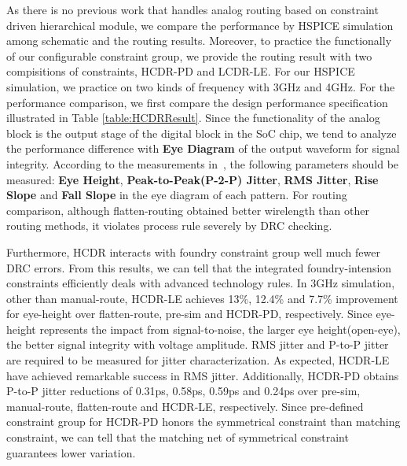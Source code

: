     As there is no previous work that handles analog routing based on constraint driven hierarchical module, we compare the performance by HSPICE simulation among schematic and the routing results. Moreover, to practice the functionally of our configurable constraint group, we provide the routing result with two compisitions of constraints, HCDR-PD and LCDR-LE. For our HSPICE simulation, we practice on two kinds of frequency with 3GHz and 4GHz. For the performance comparison, we first compare the design performance specification illustrated in Table \ref{table:HCDRResult}. Since the functionality of the analog block is the output stage of the digital block in the SoC chip, we tend to analyze the performance difference with {\bf Eye Diagram} of the output waveform for signal integrity. According to the measurements in~\cite{eyediagram}, the following parameters should be measured: {\bf Eye Height}, {\bf Peak-to-Peak(P-2-P) Jitter}, {\bf RMS Jitter}, {\bf Rise Slope} and {\bf Fall Slope} in the eye diagram of each pattern. For routing comparison, although flatten-routing obtained better wirelength than other routing methods, it violates process rule severely by DRC checking. 
    
    Furthermore, HCDR interacts with foundry constraint group well much fewer DRC errors. From this results, we can tell that the integrated foundry-intension constraints efficiently deals with advanced technology rules. In 3GHz simulation, other than manual-route, HCDR-LE achieves 13\%, 12.4\% and 7.7\% improvement for eye-height over flatten-route, pre-sim and HCDR-PD, respectively. Since eye-height represents the impact from signal-to-noise, the larger eye height(open-eye), the better signal integrity with voltage amplitude. RMS jitter and P-to-P jitter are required to be measured for jitter characterization. As expected, HCDR-LE have achieved remarkable success in RMS jitter. Additionally, HCDR-PD obtains P-to-P jitter reductions of 0.31ps, 0.58ps, 0.59ps and 0.24ps over pre-sim, manual-route, flatten-route and HCDR-LE, respectively. Since pre-defined constraint group for HCDR-PD honors the symmetrical constraint than matching constraint, we can tell that the matching net of symmetrical constraint guarantees lower variation. 
  
